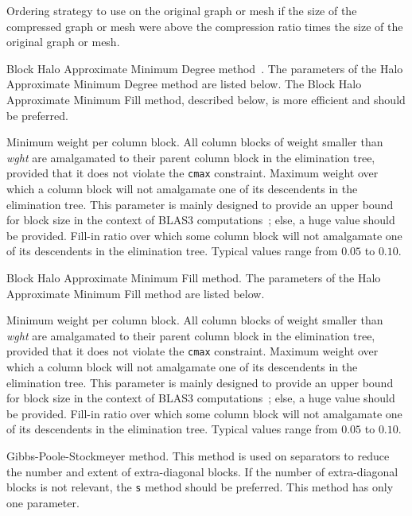 \begin{itemize}
\begin{itemize}
Ordering strategy to use on the original graph or mesh if the size of
the compressed graph or mesh were above the compression ratio times
the size of the original graph or mesh.
\end{itemize}
\iteme[{\tt d}]
Block Halo Approximate Minimum Degree method~\cite{peroam99}.
The parameters of the Halo Approximate Minimum Degree method are
listed below. The Block Halo Approximate Minimum Fill method,
described below, is more efficient and should be preferred.
\begin{itemize}
\iteme[{\tt cmin=}{\it wght}]
Minimum weight per column block. All column blocks of weight smaller
than {\it wght\/} are amalgamated to their parent column block in the
elimination tree, provided that it does not violate the {\tt cmax}
constraint.
\iteme[{\tt cmax=}{\it wght}]
Maximum weight over which a column block will not amalgamate one of
its descendents in the elimination tree. This parameter is mainly
designed to provide an upper bound for block size in the context of
BLAS3 computations~; else, a huge value should be provided.
\iteme[{\tt frat=}{\it rat}]
Fill-in ratio over which some column block will not amalgamate
one of its descendents in the elimination tree. Typical values
range from $0.05$ to $0.10$.
\end{itemize}
\iteme[{\tt f}]
Block Halo Approximate Minimum Fill method.
The parameters of the Halo Approximate Minimum Fill method are
listed below.
\begin{itemize}
\iteme[{\tt cmin=}{\it wght}]
Minimum weight per column block. All column blocks of weight smaller
than {\it wght\/} are amalgamated to their parent column block in the
elimination tree, provided that it does not violate the {\tt cmax}
constraint.
\iteme[{\tt cmax=}{\it size}]
Maximum weight over which a column block will not amalgamate one of
its descendents in the elimination tree. This parameter is mainly
designed to provide an upper bound for block size in the context of
BLAS3 computations~; else, a huge value should be provided.
\iteme[{\tt frat=}{\it rat}]
Fill-in ratio over which some column block will not amalgamate
one of its descendents in the elimination tree. Typical values
range from $0.05$ to $0.10$.
\end{itemize}
\iteme[{\tt g}]
Gibbs-Poole-Stockmeyer method. This method is used on separators
to reduce the number and extent of extra-diagonal blocks. If
the number of extra-diagonal blocks is not relevant, the {\tt s}
method should be preferred. This method has only one parameter.
\begin{itemize}

\end{itemize}
\end{itemize}

